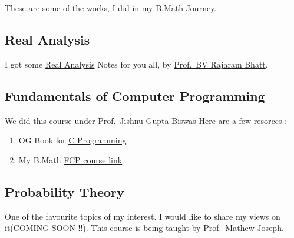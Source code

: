 \documentclass[
  letterpaper,
  DIV=11,
  numbers=noendperiod]{scrreprt}
\providecommand{\tightlist}{%
  \setlength{\itemsep}{0pt}\setlength{\parskip}{0pt}}\usepackage{longtable,booktabs,array}
\begin{document}
\begin{tcolorbox}[enhanced jigsaw, colframe=quarto-callout-note-color-frame, coltitle=black, bottomtitle=1mm, toprule=.15mm, breakable, title=\textcolor{quarto-callout-note-color}{\faInfo}\hspace{0.5em}{Sem I @ isibang}, rightrule=.15mm, titlerule=0mm, toptitle=1mm, opacityback=0, arc=.35mm, left=2mm, bottomrule=.15mm, leftrule=.75mm, opacitybacktitle=0.6, colback=white, colbacktitle=quarto-callout-note-color!10!white]

These are some of the works, I did in my B.Math Journey.

\subsection{Real Analysis}\label{real-analysis}

I got some
\href{https://drive.google.com/file/d/15aQW5bT4oBRqTgWve05l_CL1jxj97ieQ/view?usp=sharing}{Real
Analysis} Notes for you all, by
\href{https://www.isibang.ac.in/~bhat/}{Prof.~BV Rajaram Bhatt}.

\subsection{Fundamentals of Computer
Programming}\label{fundamentals-of-computer-programming}

We did this course under
\href{https://isi.irins.org/profile/13204}{Prof.~Jishnu Gupta Biswas}
Here are a few resorces :-

\begin{enumerate}
\def\labelenumi{\arabic{enumi}.}
\tightlist
\item
  OG Book for
  \href{https://drive.google.com/file/d/1JgIz5I723BBlrkGD4n0qE4n5U89LD3XY/view?usp=sharing}{C
  Programming}
\item
  My B.Math
  \href{https://www.isibang.ac.in/~adean/infsys/database/Bmath/FCP.html}{FCP
  course link}
\end{enumerate}

\subsection{Probability Theory}\label{probability-theory}

One of the favourite topics of my interest. I would like to share my
views on it(COMING SOON !!). This course is being taught by
\href{https://sites.google.com/view/mjoseph/home}{Prof.~Mathew Joseph}.


\end{tcolorbox}
\end{document}
